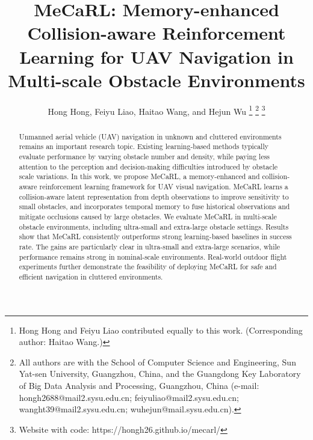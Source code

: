 \documentclass[letterpaper, 10 pt, conference]{ieeeconf}  %
\title{\LARGE \bf
MeCaRL: Memory-enhanced Collision-aware Reinforcement Learning for UAV Navigation in Multi-scale Obstacle Environments
}
\author{Hong Hong, Feiyu Liao, Haitao Wang, and Hejun Wu%
\thanks{Hong Hong and Feiyu Liao contributed equally to this work. (Corresponding author: Haitao Wang.)}%
\thanks{All authors are with the School of Computer Science and Engineering, Sun Yat-sen University, Guangzhou, China, 
and the Guangdong Key Laboratory of Big Data Analysis and Processing, Guangzhou, China (e-mail: 
hongh2688@mail2.sysu.edu.cn; feiyuliao@mail2.sysu.edu.cn; wanght39@mail2.sysu.edu.cn; wuhejun@mail.sysu.edu.cn).}%
\thanks{Website with code: https://hongh26.github.io/mecarl/}%
}
\begin{document}
\maketitle
\thispagestyle{empty}
\pagestyle{empty}




\begin{abstract}
Unmanned aerial vehicle (UAV) navigation in unknown and cluttered environments remains an important research topic. 
Existing learning-based methods typically evaluate performance by varying obstacle number and density, while paying less attention to the perception and decision-making difficulties introduced by obstacle scale variations. 
In this work, we propose MeCaRL, a memory-enhanced and collision-aware reinforcement learning framework for UAV visual navigation. 
MeCaRL learns a collision-aware latent representation from depth observations to improve sensitivity to small obstacles, and incorporates temporal memory to fuse historical observations and mitigate occlusions caused by large obstacles. 
We evaluate MeCaRL in multi-scale obstacle environments, including ultra-small and extra-large obstacle settings. 
Results show that MeCaRL consistently outperforms strong learning-based baselines in success rate. 
The gains are particularly clear in ultra-small and extra-large scenarios, while performance remains strong in nominal-scale environments. 
Real-world outdoor flight experiments further demonstrate the feasibility of deploying MeCaRL for safe and efficient navigation in cluttered environments.
\end{abstract}
\end{document}
